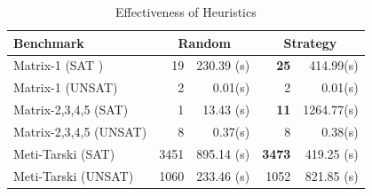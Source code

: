 \documentclass[runningheads,a4paper,oribibl]{llncs}
\begin{document}
\begin{table}[ht]
\begin{center}
\begin{tabular}{ | l | r | r | r | r |}
\hline
    \multicolumn{1}{|l|}{Benchmark} & \multicolumn{2}{c|}{Random} &
    \multicolumn{2}{c|}{Strategy} \\
\hline
    Matrix-1 (SAT ) & 19 & 230.39 (s) & \textbf{25} & 414.99(s)
\\
\hline
    Matrix-1 (UNSAT) & 2 & 0.01(s) & 2 & 0.01(s)
\\
\hline
	Matrix-2,3,4,5 (SAT) & 1 & 13.43 (s) & \textbf{11} & 1264.77(s)
\\
\hline
    Matrix-2,3,4,5 (UNSAT) & 8 & 0.37(s) & 8 & 0.38(s)
\\ \hline
    Meti-Tarski (SAT) & 3451 & 895.14 (s) & \textbf{3473} & 419.25 (s)
\\
\hline
    Meti-Tarski (UNSAT) & 1060 & 233.46 (s) & 1052 & 821.85 (s)
\\
\hline
\end{tabular}
\end{center}
\caption{Effectiveness of Heuristics} 
\label{tab:rasat-experiments}
\end{table}
\end{document}
